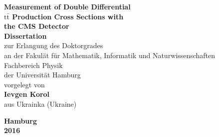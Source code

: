\begin{titlepage}

\begin{center}

{ \huge \bfseries Measurement of Double Differential}\\[0.4cm]
{ \huge \bfseries $\text{t}\bar{\text{t}}$ Production Cross Sections with}\\[0.4cm]
{ \huge \bfseries the CMS Detector}\\[5.0cm]

{\LARGE \bfseries Dissertation}\\[0.4cm]
{\LARGE  zur Erlangung des Doktorgrades}\\[0.4cm]
{\LARGE  an der Fakul{\"a}t f{\"u}r Mathematik, Informatik und Naturwissenschaften}\\[0.4cm]
{\LARGE  Fachbereich Physik}\\[0.4cm]
{\LARGE  der Universit\"at Hamburg}\\[3.0cm]

{\Large  vorgelegt von}\\[0.4cm]
{\Large \bfseries Ievgen Korol}\\[0.4cm]
{\Large  aus Ukrainka (Ukraine)}

\vfill

{\Large \bfseries Hamburg}\\[0.4cm]
{\Large \bfseries 2016}\\[0.4cm]

\end{center}

\end{titlepage}